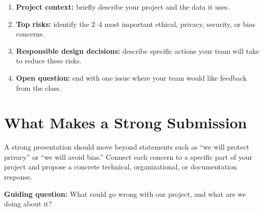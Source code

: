 \documentclass[12pt]{article}
\begin{document}
\begin{enumerate}
  \item \textbf{Project context:} briefly describe your project and the data it uses.
  \item \textbf{Top risks:} identify the 2--4 most important ethical, privacy, security, or bias concerns.
  \item \textbf{Responsible design decisions:} describe specific actions your team will take to reduce these risks.
  \item \textbf{Open question:} end with one issue where your team would like feedback from the class.
\end{enumerate}

\section*{What Makes a Strong Submission}
A strong presentation should move beyond statements such as ``we will protect privacy'' or ``we will avoid bias.'' Connect each concern to a specific part of your project and propose a concrete technical, organizational, or documentation response.

\bigskip
\noindent\textbf{Guiding question:} What could go wrong with our project, and what are we doing about it?
\end{document}
